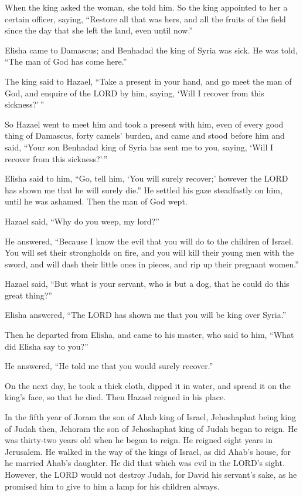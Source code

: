  When the king asked the woman, she told him. So the king
appointed to her a certain officer, saying, ``Restore all that was hers,
and all the fruits of the field since the day that she left the land,
even until now.''

 Elisha came to Damascus; and Benhadad the king of Syria was
sick. He was told, ``The man of God has come here.''

 The king said to Hazael, ``Take a present in your hand, and
go meet the man of God, and enquire of the LORD by him, saying, `Will I
recover from this sickness?'\,''

 So Hazael went to meet him and took a present with him,
even of every good thing of Damascus, forty camels' burden, and came and
stood before him and said, ``Your son Benhadad king of Syria has sent me
to you, saying, `Will I recover from this sickness?'\,''

 Elisha said to him, ``Go, tell him, `You will surely
recover;' however the LORD has shown me that he will surely die.''
 He settled his gaze steadfastly on him, until he was
ashamed. Then the man of God wept.

 Hazael said, ``Why do you weep, my lord?''

He answered, ``Because I know the evil that you will do to the children
of Israel. You will set their strongholds on fire, and you will kill
their young men with the sword, and will dash their little ones in
pieces, and rip up their pregnant women.''

 Hazael said, ``But what is your servant, who is but a dog,
that he could do this great thing?''

Elisha answered, ``The LORD has shown me that you will be king over
Syria.''

 Then he departed from Elisha, and came to his master, who
said to him, ``What did Elisha say to you?''

He answered, ``He told me that you would surely recover.''

 On the next day, he took a thick cloth, dipped it in
water, and spread it on the king's face, so that he died. Then Hazael
reigned in his place.

 In the fifth year of Joram the son of Ahab king of Israel,
Jehoshaphat being king of Judah then, Jehoram the son of Jehoshaphat
king of Judah began to reign.  He was thirty-two years old
when he began to reign. He reigned eight years in Jerusalem.
 He walked in the way of the kings of Israel, as did Ahab's
house, for he married Ahab's daughter. He did that which was evil in the
LORD's sight.  However, the LORD would not destroy Judah,
for David his servant's sake, as he promised him to give to him a lamp
for his children always.

